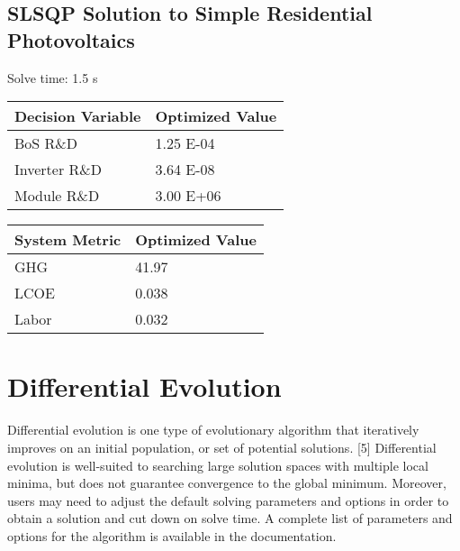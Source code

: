 \documentclass[letterpaper,10pt,english]{sphinxmanual}
\begin{document}
\subsection{SLSQP Solution to Simple Residential Photovoltaics}
\label{\detokenize{optimizers:slsqp-solution-to-simple-residential-photovoltaics}}
Solve time: 1.5 s


\begin{savenotes}\sphinxattablestart
\centering
{}
\sphinxthecaptionisattop
{}\label{\detokenize{optimizers:table-2}}\label{\detokenize{optimizers:tbl-slsqpvars}}
\sphinxaftertopcaption
\begin{tabulary}{\linewidth}[t]{|T|T|}
\hline
\sphinxstyletheadfamily 
Decision Variable
&\sphinxstyletheadfamily 
Optimized Value
\\
\hline
BoS R\&D
&
1.25 E-04
\\
\hline
Inverter R\&D
&
3.64 E-08
\\
\hline
Module R\&D
&
3.00 E+06
\\
\hline
\end{tabulary}
\par
\sphinxattableend\end{savenotes}


\begin{savenotes}\sphinxattablestart
\centering
{}
\sphinxthecaptionisattop
{}\label{\detokenize{optimizers:table-3}}\label{\detokenize{optimizers:tbl-slsqpmetrics}}
\sphinxaftertopcaption
\begin{tabulary}{\linewidth}[t]{|T|T|}
\hline
\sphinxstyletheadfamily 
System Metric
&\sphinxstyletheadfamily 
Optimized Value
\\
\hline
GHG
&
41.97
\\
\hline
LCOE
&
0.038
\\
\hline
Labor
&
0.032
\\
\hline
\end{tabulary}
\par
\sphinxattableend\end{savenotes}


\section{Differential Evolution}
\label{\detokenize{optimizers:differential-evolution}}
Differential evolution is one type of evolutionary algorithm that iteratively improves on an initial population, or set of potential solutions. {[}5{]} Differential evolution is well-suited to searching large solution spaces with multiple local minima, but does not guarantee convergence to the global minimum. Moreover, users may need to adjust the default solving parameters and options in order to obtain a solution and cut down on solve time. A complete list of parameters and options for the  algorithm is available in the  documentation.
\end{document}
